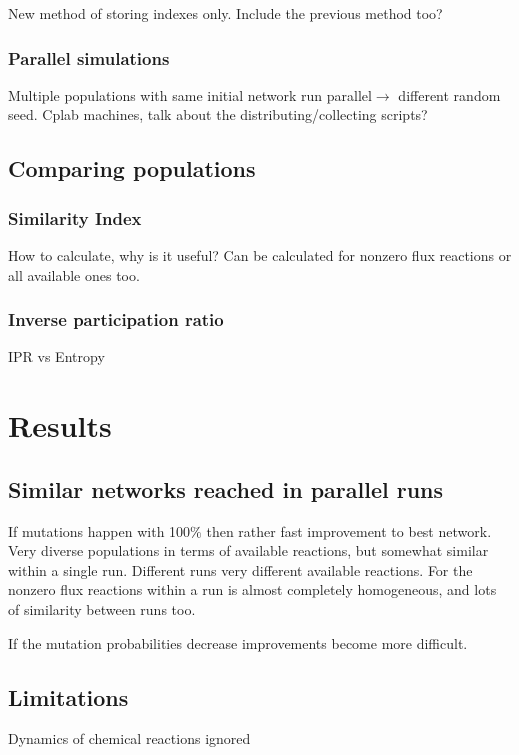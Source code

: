 \documentclass[10pt,a4paper]{article}
\begin{document}
New method of storing indexes only. Include the previous method too?

\subsubsection{Parallel simulations}
\label{ssub:Paralell simulations}
Multiple populations with same initial network  run parallel$\rightarrow$ different random seed. Cplab machines, talk about the distributing/collecting scripts?


\subsection{Comparing populations}
\label{sub:comparing_populations}


\subsubsection{Similarity Index}
\label{ssub:Similarity Index}

How to calculate, why is it useful? Can be calculated for nonzero flux reactions or all available ones too. 

\subsubsection{Inverse participation ratio}
\label{ssub:Inverse participation ratio}
IPR vs Entropy


\section{Results}
\label{sec:results}

\subsection{Similar networks reached in parallel runs}
\label{sub:similar_networks_reached_in_paralell_runs}


If mutations happen with 100$\%$ then rather fast improvement to best network. Very diverse populations in terms of available reactions, but somewhat similar within a single run. Different runs very different available reactions. For the nonzero flux reactions within a run is almost completely homogeneous, and lots of similarity between runs too. 

If the mutation probabilities decrease improvements become more difficult.

\subsection{Limitations}
\label{sub:limitations}
Dynamics of chemical reactions ignored
\end{document}
